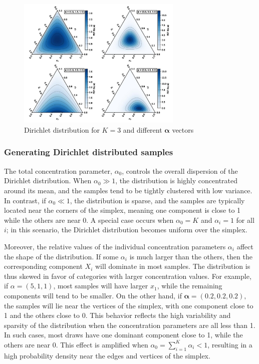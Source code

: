 \documentclass[12pt,a4paper]{article}
\begin{document}
	\begin{figure}[h!]
		\centering
		\includegraphics[width=0.7\textwidth]{dirichletDist3d.jpg}
		\caption{Dirichlet distribution for \( K = 3 \) and different \( \boldsymbol{\alpha} \) vectors\cite{wikipedia_dirichlet_pdf}}
		\label{fig:dirich3d}
	\end{figure}
	\subsubsection*{Generating Dirichlet distributed samples}
	\noindent
	The total concentration parameter, $\alpha_0$, 
	controls the overall dispersion of the Dirichlet distribution. When \( \alpha_0 \gg 1 \), the distribution is highly concentrated around its mean, and the samples tend to be tightly clustered with low variance. In contrast, if \( \alpha_0 \ll 1 \), the distribution is sparse, and the samples are typically located near the corners of the simplex, meaning one component is close to 1 while the others are near 0. A special case occurs when \( \alpha_0 = K \) and \( \alpha_i = 1 \) for all \( i \); in this scenario, the Dirichlet distribution becomes uniform over the simplex.
	
	Moreover, the relative values of the individual concentration parameters \( \alpha_i \) affect the shape of the distribution. If some \( \alpha_i \) is much larger than the others, then the corresponding component \( X_i \) will dominate in most samples. The distribution is thus skewed in favor of categories with larger concentration values. For example, if $\alpha = (5, 1, 1)$, 	most samples will have larger $x_1$, while the remaining components will tend to be smaller. On the other hand, if \(
	\boldsymbol{\alpha} = (0.2, 0.2, 0.2),\)
	the samples will lie near the vertices of the simplex, with one component close to 1 and the others close to 0. This behavior reflects the high variability and sparsity of the distribution when the concentration parameters are all less than 1. 
	\noindent
	In such cases, most draws have one dominant component close to 1, while the others are near 0. This effect is amplified when \( \alpha_0 = \sum_{i=1}^K \alpha_i < 1 \), resulting in a high probability density near the edges and vertices of the simplex.
	
\end{document}

